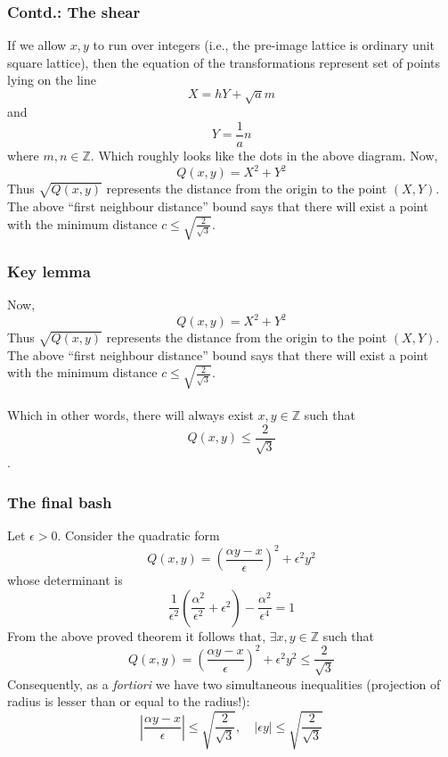 \documentclass{beamer}
\begin{document}
    \begin{frame}
        \frametitle{Contd.: The shear}
        If we allow \(x,y\) to run over integers (i.e., the pre-image lattice is ordinary unit square lattice), then the equation of the transformations represent set of points lying on the line \[X = h Y + \sqrt{a}m\] and \[Y = \frac{1}{a}n\] where \(m, n \in \mathbb{Z}\). Which roughly looks like the dots in the above diagram. Now, \[Q(x,y) = X^2 + Y^2\] Thus \(\sqrt{Q(x,y)}\) represents the distance from the origin to the point \((X,Y)\). The above ``first neighbour distance'' bound says that there will exist a point with the minimum distance \(c \leq \sqrt{\frac{2}{\sqrt{3}}}\).
    \end{frame}

    \begin{frame}

        \frametitle{Key lemma}

        Now, \[Q(x,y) = X^2 + Y^2\] Thus \(\sqrt{Q(x,y)}\) represents the distance from the origin to the point \((X,Y)\). The above ``first neighbour distance'' bound says that there will exist a point with the minimum distance \(c \leq \sqrt{\frac{2}{\sqrt{3}}}\). \\~\\
        
        Which in other words, there will always exist \(x,y \in \mathbb{Z}\) such that \[Q(x,y) \leq \frac{2}{\sqrt{3}}\].
    \end{frame}

    \begin{frame}
        \frametitle{The final bash}

        Let \(\epsilon > 0\). Consider the quadratic form \[Q(x,y) = \left(\frac{\alpha y - x}{\epsilon}\right)^2 + \epsilon^2y^2\] whose determinant is \[\frac{1}{\epsilon^2}\left(\frac{\alpha^2}{\epsilon^2} + \epsilon^2\right) - \frac{\alpha^2}{\epsilon^4} = 1\] From the above proved theorem it follows that, \(\exists x,y \in \mathbb{Z}\) such that \[Q(x,y) = \left(\frac{\alpha y - x}{\epsilon}\right)^2 + \epsilon^2y^2 \leq \frac{2}{\sqrt{3}}\] Consequently, as a \emph{fortiori} we have two simultaneous inequalities (projection of radius is lesser than or equal to the radius!): \[\left|\frac{\alpha y - x}{\epsilon}\right| \leq \sqrt{\frac{2}{\sqrt{3}}}, \quad |\epsilon y| \leq \sqrt{\frac{2}{\sqrt{3}}}\]
    \end{frame}
\end{document}
